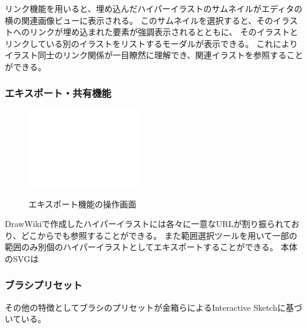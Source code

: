 リンク機能を用いると、埋め込んだハイパーイラストのサムネイルがエディタの横の関連画像ビューに表示される。
このサムネイルを選択すると、そのイラストへのリンクが埋め込まれた要素が強調表示されるとともに、
そのイラストとリンクしている別のイラストをリストするモーダルが表示できる。
これによりイラスト同士のリンク関係が一目瞭然に理解でき、関連イラストを参照することができる。

%
%

\subsubsection{エキスポート・共有機能}

\begin{figure}[htbp]
    \begin{center}
    {\includegraphics[width=50mm]{images/testimage.png}} \end{center}
    \caption{エキスポート機能の操作画面}
    \label{exporting}
\end{figure}

DrawWikiで作成したハイパーイラストには各々に一意なURLが割り振られており、どこからでも参照することができる。
また範囲選択ツールを用いて一部の範囲のみ別個のハイパーイラストとしてエキスポートすることができる。
本体のSVGは

\subsubsection{ブラシプリセット}
その他の特徴としてブラシのプリセットが金箱らによるInteractive Sketch\cite{130004638060}に基づいている。


